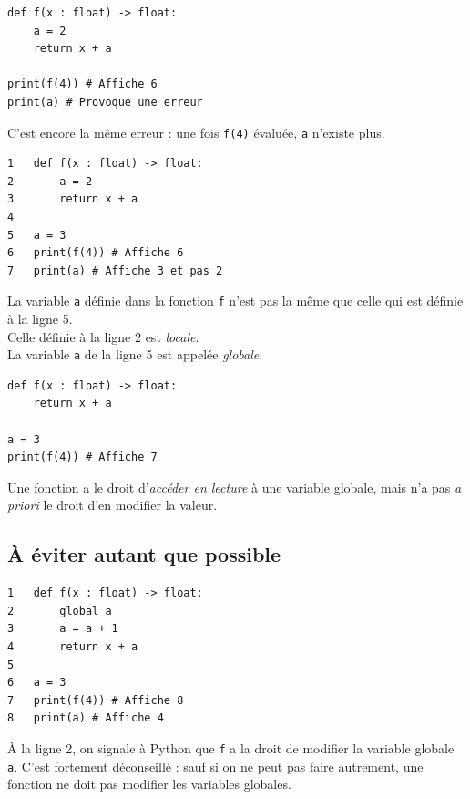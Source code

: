\begin{pyc}
\begin{verbatim}
def f(x : float) -> float:
    a = 2
    return x + a

print(f(4)) # Affiche 6        
print(a) # Provoque une erreur
    \end{verbatim}
\end{pyc}
C'est encore la même erreur : une fois \texttt{f(4)} évaluée, \texttt{a} n'existe plus.\\

\begin{pyc}
\begin{verbatim}
1   def f(x : float) -> float:
2       a = 2
3       return x + a
4
5   a = 3
6   print(f(4)) # Affiche 6
7   print(a) # Affiche 3 et pas 2
\end{verbatim}
\end{pyc}

La variable \texttt{a} définie dans la fonction \texttt{f} n'est pas la même que celle qui est définie à la ligne 5.\\
Celle définie à la ligne 2 est \textit{locale}.\\
La variable \texttt{a} de la ligne 5 est appelée \textit{globale}.\\



\begin{pyc}
\begin{verbatim}
def f(x : float) -> float:
    return x + a
        
a = 3
print(f(4)) # Affiche 7
\end{verbatim}
\end{pyc}
\begin{aretenir}
Une fonction a le droit d'\textit{accéder en lecture} à une variable globale, mais n'a pas \textit{a priori} le droit d'en modifier la valeur.
\end{aretenir}

\subsection{À éviter autant que possible}



\begin{pyc}
\begin{verbatim}
1   def f(x : float) -> float:
2       global a 
3       a = a + 1
4       return x + a
5        
6   a = 3
7   print(f(4)) # Affiche 8
8   print(a) # Affiche 4       
\end{verbatim}
\end{pyc}
À la ligne 2, on signale à Python que \texttt{f} a la droit de modifier la variable globale \texttt{a}.
C'est fortement déconseillé : sauf si on ne peut pas faire autrement, une fonction ne doit pas modifier les variables globales.